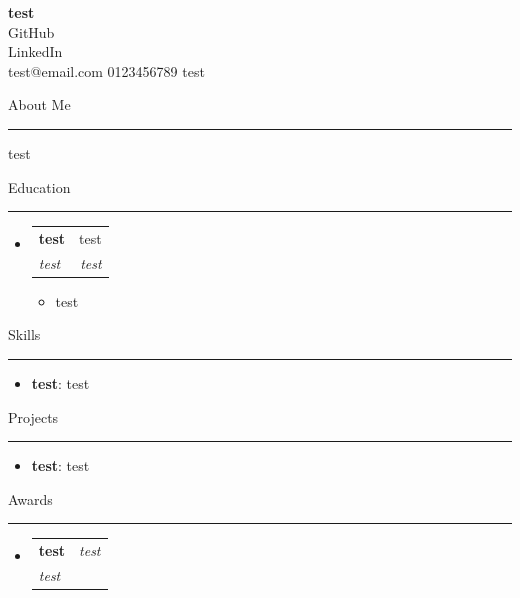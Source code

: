 \documentclass[letterpaper,12pt]{article}
\makeatletter
\newcommand{\href}[2]{#2}
\renewcommand{\section}[1]{%
  \vspace{6pt}%
  {\large\scshape\raggedright #1}\par\vspace{2pt}%
  \hrule\vspace{5pt}%
}
\newcommand{\resumeItem}[2]{%
  \item\small{\textbf{#1}{: #2 \vspace{-2pt}}}%
}
\newcommand{\resumeSubheading}[4]{%
  \vspace{-1pt}\item
    \begin{tabular*}{0.97\textwidth}[t]{l@{\extracolsep{\fill}}r}
      \textbf{#1} & #2 \\
      \textit{\small #3} & \textit{\small #4} \\
    \end{tabular*}\vspace{-5pt}
}
\newcommand{\resumeItemPlain}[1]{%
  \item\small{{#1 \vspace{-2pt}}}%
}
\newcommand{\resumeAward}[3]{%
  \vspace{-1pt}\item
    \begin{tabular*}{0.97\textwidth}[t]{l@{\extracolsep{\fill}}r}
      \textbf{#1} & \textit{\small #3} \\
      \multicolumn{2}{p{0.97\textwidth}}{\textit{\small #2}} \\
    \end{tabular*}\vspace{-7pt}
}
\newcommand{\resumeSubItem}[2]{\resumeItem{#1}{#2}\vspace{-4pt}}
\newcommand{\resumeSubHeadingListStart}{\begin{itemize}\setlength{\leftmargin}{0pt}\setlength{\itemsep}{2pt}}
\newcommand{\resumeSubHeadingListEnd}{\end{itemize}}
\newcommand{\resumeItemListStart}{\begin{itemize}\setlength{\itemsep}{1pt}}
\newcommand{\resumeItemListEnd}{\end{itemize}\vspace{-5pt}}
\makeatother
\begin{document}
\begin{center}
    {\fontsize{21}{23}\selectfont\bfseries test}\\[5pt]
    \href{https://github.com/test}{GitHub}\\[5pt]
    \href{https://linkedin.com/test}{LinkedIn}\\[5pt]
\href{mailto:test@email.com}{test@email.com}    \hspace{1em}\textbar\hspace{1em}0123456789    \hspace{1em}\textbar\hspace{1em}test
\end{center}

\vspace{-8pt}
\section{About Me}
\small{
test
}

\section{Education}
  \resumeSubHeadingListStart
    \resumeSubheading
      {test}
      {test}
      {test}
      {test}

      \resumeItemListStart
        \resumeItemPlain{test}
      \resumeItemListEnd

  \resumeSubHeadingListEnd

\section{Skills}
  \resumeSubHeadingListStart
  \resumeSubItem{test}
    {test}
  \resumeSubHeadingListEnd

\section{Projects}
  \resumeSubHeadingListStart
    \resumeSubItem{\href{test}{test}}
      {test}
  \resumeSubHeadingListEnd

\section{Awards}
  \resumeSubHeadingListStart
    \resumeAward
      {test}
      {test}
      {test}

  \resumeSubHeadingListEnd



\end{document}

